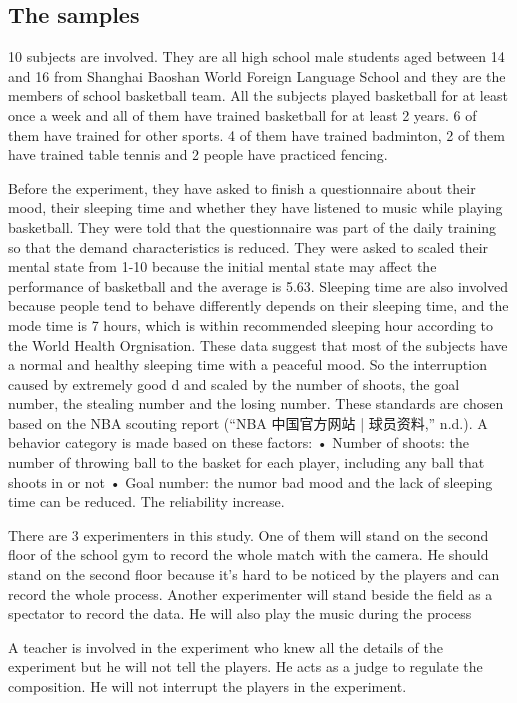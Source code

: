 \documentclass{article}
\begin{document}
\subsection{The samples}
10 subjects are involved. They are all high school male students aged between 14 and 16 from Shanghai Baoshan World Foreign Language School and they are the members of school basketball team. All the subjects played basketball for at least once a week and all of them have trained basketball for at least 2 years. 6 of them have trained for other sports. 4 of them have trained badminton, 2 of them have trained table tennis and 2 people have practiced fencing. 

Before the experiment, they have asked to finish a questionnaire about their mood, their sleeping time and whether they have listened to music while playing basketball. They were told that the questionnaire was part of the daily training so that the demand characteristics is reduced. They were asked to scaled their mental state from 1-10 because the initial mental state may affect the performance of basketball \todo{()} and the average is 5.63. Sleeping time are also involved because people tend to behave differently depends on their sleeping time, and the mode time is 7 hours, which is within recommended sleeping hour according to the World Health Orgnisation. These data suggest that most of the subjects have a normal and healthy sleeping time with a peaceful mood. So the interruption caused by extremely good d and scaled by the number of
shoots, the goal number, the stealing number and the losing number. These
standards are chosen based on the NBA scouting report (“NBA 中国官方网站
| 球员资料,” n.d.). A behavior category is made based on these factors:
• Number of shoots: the number of throwing ball to the basket for each
player, including any ball that shoots in or not
• Goal number: the numor bad mood and the lack of sleeping time can be reduced. The reliability increase.

There are 3 experimenters in this study. One of them will stand on the second floor of the school gym to record the whole match with the camera. He should stand on the second floor because it's hard to be noticed by the players and can record the whole process. Another experimenter will stand beside the field as a spectator to record the data. He will also play the music during the process

A teacher is involved in the experiment who knew all the details of the experiment but he will not tell the players. He acts as a judge to regulate the composition. He will not interrupt the players in the experiment. 
\end{document}
